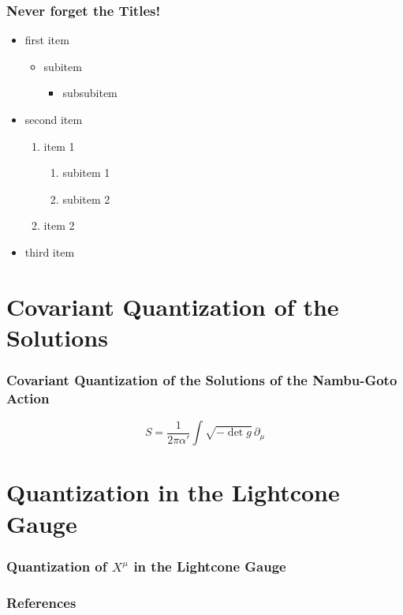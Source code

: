 \documentclass[aspectratio=169]{beamer}
\begin{document}
	\begin{frame}
		\frametitle{Never forget the Titles!}
		\begin{itemize}
			\item<1,2,3,4,5> first item 
			\begin{itemize}
				\item<2,3,4,5> subitem
				\begin{itemize}
					\item<3,4,5> subsubitem
				\end{itemize}
			\end{itemize}
			\item<4,5>second item
			\begin{enumerate}
				\item item 1
				\begin{enumerate}
					\item subitem 1
					\item subitem 2
				\end{enumerate}
				\item item 2
			\end{enumerate}
			\item<5>third item
		\end{itemize}	
	\end{frame}

	\section{Covariant Quantization of the Solutions}
	
	\begin{frame}
		\frametitle{Covariant Quantization of the Solutions of the Nambu-Goto Action}
		
		\begin{equation}
			S = \frac{1}{2\pi\alpha'}\int\sqrt{-\det g} \, \partial_\mu
		\end{equation}
	
	\end{frame}	

	\section{Quantization in the Lightcone Gauge}
	
	\begin{frame}
		\frametitle{Quantization of $X^\mu$ in the Lightcone Gauge}
	\end{frame}

	\begin{frame}
		\frametitle{References}
		\printbibliography
	\end{frame}
\end{document}

